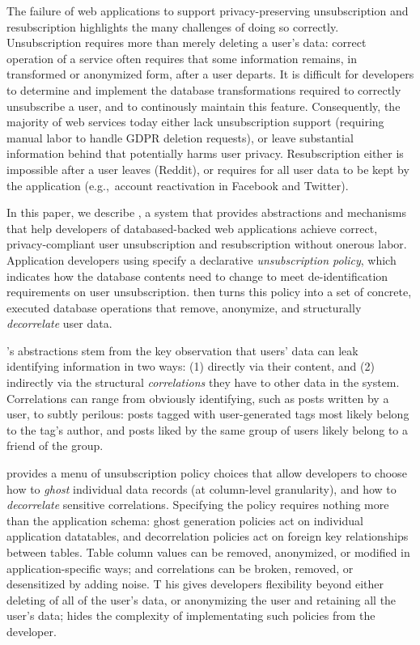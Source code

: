 The failure of web applications to support privacy-preserving unsubscription and resubscription  
highlights the many challenges of doing so correctly.
%
Unsubscription requires more than merely deleting a user's data: correct operation
of a service often requires that some information remains, in transformed or
anonymized form, after a user departs.
%
%
It is difficult for developers to determine and implement the database
transformations required to correctly unsubscribe a user, and to continously
maintain this feature.
%
Consequently, the majority of web services today either lack unsubscription support
(requiring manual labor to handle \eg GDPR deletion requests), or leave substantial
information behind that potentially harms user privacy.
%
Resubscription either is impossible after a user leaves (\eg Reddit), or requires for all user data
to be kept by the application (e.g.,\ account reactivation in Facebook and Twitter).

In this paper, we describe \sys, a system that provides abstractions and mechanisms
that help developers of databased-backed web applications achieve correct,
privacy-compliant user unsubscription and resubscription without onerous labor.
%
Application developers using \sys specify a declarative \emph{unsubscription policy},
which indicates how the database contents need to change to meet de-identification
requirements on user unsubscription.
%
\sys then turns this policy into a set of concrete, executed database operations that remove,
anonymize, and structurally \emph{decorrelate} user data.

\sys's abstractions stem from the key observation that users' data can leak identifying information
in two ways: (1) directly via their content, and (2) indirectly via the structural
\emph{correlations} they have to other data in the system.  Correlations can range from obviously
identifying, such as posts written by a user, to subtly perilous: posts tagged with user-generated
tags most likely belong to the tag's author, and posts liked by the same group of users likely
belong to a friend of the group.

%
\sys provides a menu of unsubscription policy choices 
that allow developers to choose how to \emph{ghost} individual data records
(at column-level granularity), and how to
\emph{decorrelate} sensitive correlations. Specifying the policy requires nothing more than the
application schema: ghost generation policies act on individual application datatables, and
decorrelation policies act on foreign key relationships between tables.
Table column values can be removed, anonymized, or modified in application-specific ways; and
correlations can be broken, removed, or desensitized by adding noise. T
his gives developers flexibility beyond either deleting of all of
the user's data, or anonymizing the user and retaining all the user's data; \sys hides the
complexity of implementating such policies from the developer.

